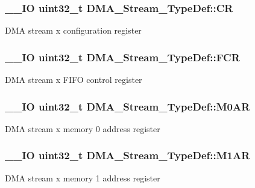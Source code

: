 \subsubsection[{C\+R}]{\setlength{\rightskip}{0pt plus 5cm}\+\_\+\+\_\+\+I\+O uint32\+\_\+t D\+M\+A\+\_\+\+Stream\+\_\+\+Type\+Def\+::\+C\+R}\label{struct_d_m_a___stream___type_def_af893adc5e821b15d813237b2bfe4378b}
D\+M\+A stream x configuration register \hypertarget{struct_d_m_a___stream___type_def_aad3d78ab35e7af48951be5be53392f9f}{}
\subsubsection[{F\+C\+R}]{\setlength{\rightskip}{0pt plus 5cm}\+\_\+\+\_\+\+I\+O uint32\+\_\+t D\+M\+A\+\_\+\+Stream\+\_\+\+Type\+Def\+::\+F\+C\+R}\label{struct_d_m_a___stream___type_def_aad3d78ab35e7af48951be5be53392f9f}
D\+M\+A stream x F\+I\+F\+O control register \hypertarget{struct_d_m_a___stream___type_def_a965da718db7d0303bff185d367d96fd6}{}
\subsubsection[{M0\+A\+R}]{\setlength{\rightskip}{0pt plus 5cm}\+\_\+\+\_\+\+I\+O uint32\+\_\+t D\+M\+A\+\_\+\+Stream\+\_\+\+Type\+Def\+::\+M0\+A\+R}\label{struct_d_m_a___stream___type_def_a965da718db7d0303bff185d367d96fd6}
D\+M\+A stream x memory 0 address register \hypertarget{struct_d_m_a___stream___type_def_a142ca5a1145ba9cf4cfa557655af1c13}{}
\subsubsection[{M1\+A\+R}]{\setlength{\rightskip}{0pt plus 5cm}\+\_\+\+\_\+\+I\+O uint32\+\_\+t D\+M\+A\+\_\+\+Stream\+\_\+\+Type\+Def\+::\+M1\+A\+R}\label{struct_d_m_a___stream___type_def_a142ca5a1145ba9cf4cfa557655af1c13}
D\+M\+A stream x memory 1 address register \hypertarget{struct_d_m_a___stream___type_def_a2cc2a52628182f9e79ab1e49bb78a1eb}{}
